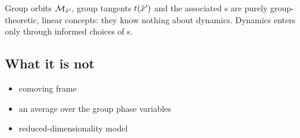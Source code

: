 Group orbits ${\cal M}_{{\hat{x}'}}$, group tangents $t({\hat{x}'})$ and the
associated \slice s are purely group-theoretic, linear concepts: they know nothing
about dynamics. Dynamics enters only through informed choices of \template s.


\subsection{What it is not}
    \begin{itemize}
      \item comoving frame
      \item an average over the group phase variables
      \item reduced-dimensionality model
    \end{itemize}
